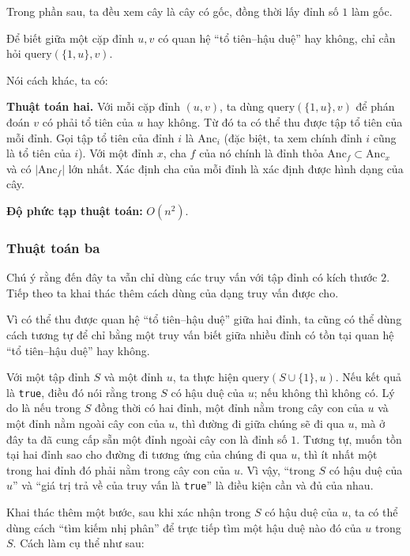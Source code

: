\documentclass[11pt]{article}
\begin{document}
Trong phần sau, ta đều xem cây là cây có gốc, đồng thời lấy đỉnh số \(1\) làm
gốc.

Để biết giữa một cặp đỉnh \(u,v\) có quan hệ ``tổ tiên--hậu duệ'' hay không,
chỉ cần hỏi \(\mathrm{query}(\{1,u\},v)\).

Nói cách khác, ta có:

\textbf{Thuật toán hai.} Với mỗi cặp đỉnh \((u,v)\), ta dùng
\(\mathrm{query}(\{1,u\},v)\) để phán đoán \(v\) có phải tổ tiên của \(u\) hay
không. Từ đó ta có thể thu được tập tổ tiên của mỗi đỉnh. Gọi tập tổ tiên của
đỉnh \(i\) là \(\mathrm{Anc}_i\) (đặc biệt, ta xem chính đỉnh \(i\) cũng là tổ
tiên của \(i\)). Với một đỉnh \(x\), cha \(f\) của nó chính là đỉnh thỏa
\(\mathrm{Anc}_f\subset \mathrm{Anc}_x\) và có \(|\mathrm{Anc}_f|\) lớn nhất.
Xác định cha của mỗi đỉnh là xác định được hình dạng của cây.

\textbf{Độ phức tạp thuật toán:} \(O(n^2)\).

\subsubsection{Thuật toán ba}

Chú ý rằng đến đây ta vẫn chỉ dùng các truy vấn với tập đỉnh có kích thước
\(2\). Tiếp theo ta khai thác thêm cách dùng của dạng truy vấn được cho.

Vì có thể thu được quan hệ ``tổ tiên--hậu duệ'' giữa hai đỉnh, ta cũng có thể
dùng cách tương tự để chỉ bằng một truy vấn biết giữa nhiều đỉnh có tồn tại quan
hệ ``tổ tiên--hậu duệ'' hay không.

Với một tập đỉnh \(S\) và một đỉnh \(u\), ta thực hiện
\(\mathrm{query}(S\cup\{1\},u)\). Nếu kết quả là \texttt{true}, điều đó nói rằng
trong \(S\) có hậu duệ của \(u\); nếu không thì không có. Lý do là nếu trong
\(S\) đồng thời có hai đỉnh, một đỉnh nằm trong cây con của \(u\) và một đỉnh
nằm ngoài cây con của \(u\), thì đường đi giữa chúng sẽ đi qua \(u\), mà ở đây
ta đã cung cấp sẵn một đỉnh ngoài cây con là đỉnh số \(1\). Tương tự, muốn tồn
tại hai đỉnh sao cho đường đi tương ứng của chúng đi qua \(u\), thì ít nhất một
trong hai đỉnh đó phải nằm trong cây con của \(u\). Vì vậy, ``trong \(S\) có hậu
duệ của \(u\)'' và ``giá trị trả về của truy vấn là \texttt{true}'' là điều kiện
cần và đủ của nhau.

Khai thác thêm một bước, sau khi xác nhận trong \(S\) có hậu duệ của \(u\), ta
có thể dùng cách ``tìm kiếm nhị phân'' để trực tiếp tìm một hậu duệ nào đó của
\(u\) trong \(S\). Cách làm cụ thể như sau:
\end{document}
